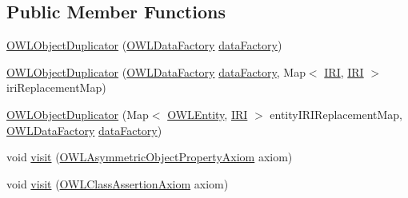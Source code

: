 \subsection*{Public Member Functions}
\begin{DoxyCompactItemize}
\item 
\hyperlink{classorg_1_1semanticweb_1_1owlapi_1_1util_1_1_o_w_l_object_duplicator_a742b8e0449f9b6ac6e248475d212bf93}{O\-W\-L\-Object\-Duplicator} (\hyperlink{interfaceorg_1_1semanticweb_1_1owlapi_1_1model_1_1_o_w_l_data_factory}{O\-W\-L\-Data\-Factory} \hyperlink{classorg_1_1semanticweb_1_1owlapi_1_1util_1_1_o_w_l_object_duplicator_a0b21efd4bc36ed4955d421aec99f4303}{data\-Factory})
\item 
\hyperlink{classorg_1_1semanticweb_1_1owlapi_1_1util_1_1_o_w_l_object_duplicator_a7245811cd633d81ef5aa941f2b54b904}{O\-W\-L\-Object\-Duplicator} (\hyperlink{interfaceorg_1_1semanticweb_1_1owlapi_1_1model_1_1_o_w_l_data_factory}{O\-W\-L\-Data\-Factory} \hyperlink{classorg_1_1semanticweb_1_1owlapi_1_1util_1_1_o_w_l_object_duplicator_a0b21efd4bc36ed4955d421aec99f4303}{data\-Factory}, Map$<$ \hyperlink{classorg_1_1semanticweb_1_1owlapi_1_1model_1_1_i_r_i}{I\-R\-I}, \hyperlink{classorg_1_1semanticweb_1_1owlapi_1_1model_1_1_i_r_i}{I\-R\-I} $>$ iri\-Replacement\-Map)
\item 
\hyperlink{classorg_1_1semanticweb_1_1owlapi_1_1util_1_1_o_w_l_object_duplicator_a811c33c8c590bc40ec185fa3e36982bb}{O\-W\-L\-Object\-Duplicator} (Map$<$ \hyperlink{interfaceorg_1_1semanticweb_1_1owlapi_1_1model_1_1_o_w_l_entity}{O\-W\-L\-Entity}, \hyperlink{classorg_1_1semanticweb_1_1owlapi_1_1model_1_1_i_r_i}{I\-R\-I} $>$ entity\-I\-R\-I\-Replacement\-Map, \hyperlink{interfaceorg_1_1semanticweb_1_1owlapi_1_1model_1_1_o_w_l_data_factory}{O\-W\-L\-Data\-Factory} \hyperlink{classorg_1_1semanticweb_1_1owlapi_1_1util_1_1_o_w_l_object_duplicator_a0b21efd4bc36ed4955d421aec99f4303}{data\-Factory})
\item 
void \hyperlink{classorg_1_1semanticweb_1_1owlapi_1_1util_1_1_o_w_l_object_duplicator_a7f9b94f578f977c44174c2da6690ff1f}{visit} (\hyperlink{interfaceorg_1_1semanticweb_1_1owlapi_1_1model_1_1_o_w_l_asymmetric_object_property_axiom}{O\-W\-L\-Asymmetric\-Object\-Property\-Axiom} axiom)
\item 
void \hyperlink{classorg_1_1semanticweb_1_1owlapi_1_1util_1_1_o_w_l_object_duplicator_aa99237cc7c4fdfad890032c6cd9270b7}{visit} (\hyperlink{interfaceorg_1_1semanticweb_1_1owlapi_1_1model_1_1_o_w_l_class_assertion_axiom}{O\-W\-L\-Class\-Assertion\-Axiom} axiom)
\item 

\end{DoxyCompactItemize}
